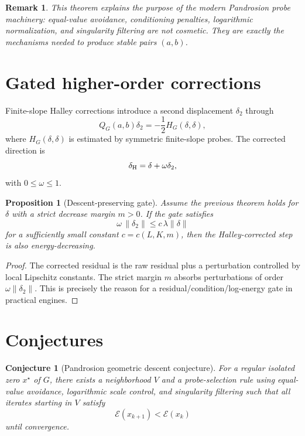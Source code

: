 \documentclass[11pt]{article}
\newtheorem{proposition}[definition]{Proposition}
\newtheorem{conjecture}[definition]{Conjecture}
\newtheorem{remark}[definition]{Remark}
\newcommand{\E}{\mathcal{E}}
\newcommand{\Q}{Q_G}
\begin{document}
\begin{remark}
This theorem explains the purpose of the modern Pandrosion probe machinery: equal-value avoidance, conditioning penalties, logarithmic normalization, and singularity filtering are not cosmetic. They are exactly the mechanisms needed to produce stable pairs $(a,b)$.
\end{remark}

\section{Gated higher-order corrections}
Finite-slope Halley corrections introduce a second displacement $\delta_2$ through
\begin{equation}
    \Q(a,b)\delta_2=-\frac12 H_G(\delta,\delta),
\end{equation}
where $H_G(\delta,\delta)$ is estimated by symmetric finite-slope probes. The corrected direction is
\begin{equation}
    \delta_{\rm H}=\delta+\omega\delta_2,
\end{equation}
with $0\le \omega\le 1$.

\begin{proposition}[Descent-preserving gate]
Assume the previous theorem holds for $\delta$ with a strict decrease margin $m>0$. If the gate satisfies
\begin{equation}
\omega\,\|\delta_2\|\le c\,\lambda\|\delta\|
\end{equation}
for a sufficiently small constant $c=c(L,K,m)$, then the Halley-corrected step is also energy-decreasing.
\end{proposition}

\begin{proof}
The corrected residual is the raw residual plus a perturbation controlled by local Lipschitz constants. The strict margin $m$ absorbs perturbations of order $\omega\|\delta_2\|$. This is precisely the reason for a residual/condition/log-energy gate in practical engines.
\end{proof}

\section{Conjectures}
\begin{conjecture}[Pandrosion geometric descent conjecture]
For a regular isolated zero $x^\star$ of $G$, there exists a neighborhood $V$ and a probe-selection rule using equal-value avoidance, logarithmic scale control, and singularity filtering such that all iterates starting in $V$ satisfy
\begin{equation}
    \E(x_{k+1})<\E(x_k)
\end{equation}
until convergence.
\end{conjecture}
\end{document}
